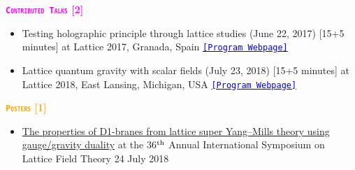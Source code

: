  
\textcolor{magenta}{\textbf{\textsc{\fontsize{11}{48} \bfseries \texttt{Contributed Talks} [2]}}}
\begin{itemize}
  \item Testing holographic principle through lattice studies (June 22, 2017) [15+5 minutes]  at Lattice 2017, Granada, Spain
  \href{https://makondo.ugr.es/event/0/session/96/contribution/50}{{\texttt{\textcolor{blue}{[Program Webpage]}}}}
  \item Lattice quantum gravity with scalar fields (July 23, 2018) [15+5 minutes]  at Lattice 2018, East Lansing, Michigan, USA   
  \href{https://indico.fnal.gov/event/15949/session/15/contribution/80}{{\texttt{\textcolor{blue}{[Program Webpage]}}}}
\end{itemize}
 

\textcolor{orange}{\textbf{\textsc{\fontsize{11}{48} \bfseries \texttt{Posters} [1]}}}
  \begin{itemize}
 \item \href{https://indico.fnal.gov/event/15949/session/4/contribution/66}{The properties of D1-branes from lattice super Yang--Mills theory using gauge/gravity duality} at the 36$^{\rm{th}}$ Annual International Symposium on Lattice Field Theory \hfill 24 July 2018
\end{itemize}
